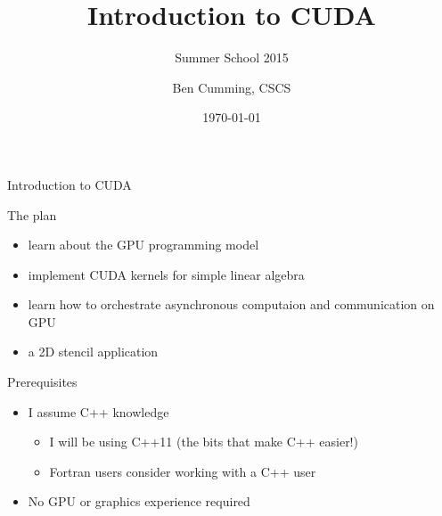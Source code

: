 \documentclass[aspectratio=43]{beamer}
\author{Ben Cumming, CSCS}
\title{Introduction to CUDA}
\subtitle{Summer School 2015}
\date{\today}
\begin{document}
\cscstitle



\begin{frame}[fragile]{Introduction to CUDA}
    \begin{info}{The plan}
        \begin{itemize}
            \item learn about the GPU programming model
            \item implement CUDA kernels for simple linear algebra
            \item learn how to orchestrate asynchronous computaion and communication on GPU
            \item a 2D stencil application
        \end{itemize}
    \end{info}

    \begin{info}{Prerequisites}
        \begin{itemize}
            \item I assume C++ knowledge
            \begin{itemize}
                \item I will be using C++11 (the bits that make C++ easier!)
                \item Fortran users consider working with a C++ user
            \end{itemize}
            \item No GPU or graphics experience required
        \end{itemize}
    \end{info}

\end{frame}
\end{document}
